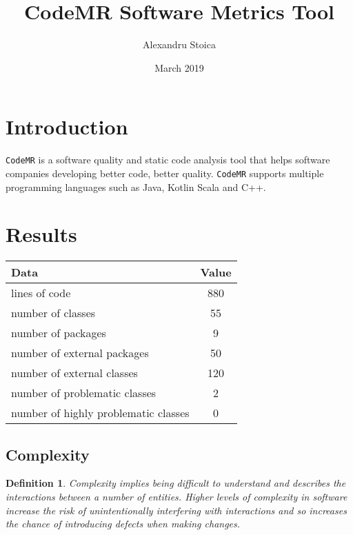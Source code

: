 \documentclass[11pt]{article}
\title{CodeMR Software Metrics Tool}
\author{Alexandru Stoica}
\date{March 2019}
\newtheorem{definition}{Definition}
\begin{document}
\maketitle

\section{Introduction}
\texttt{CodeMR} is a software quality and static code analysis tool that helps software companies developing better code, better quality. \texttt{CodeMR} supports multiple programming languages such as Java, Kotlin Scala and C++.

\section{Results}

\begin{center}
\begin{table}[h]
\begin{tabular}{|l|c|}
\hline
Data                                 & Value \\ \hline
lines of code                        & 880   \\ \hline
number of classes                    & 55    \\ \hline
number of packages                   & 9     \\ \hline
number of external packages          & 50    \\ \hline
number of external classes           & 120   \\ \hline
number of problematic classes        & 2     \\ \hline
number of highly problematic classes & 0     \\ \hline
\end{tabular}
\end{table}
\end{center}

\subsection{Complexity}

\begin{definition}
Complexity implies being difficult to understand and describes the interactions between a number of entities. Higher levels of complexity in software increase the risk of unintentionally interfering with interactions and so increases the chance of introducing defects when making changes.
\end{definition}
\end{document}

